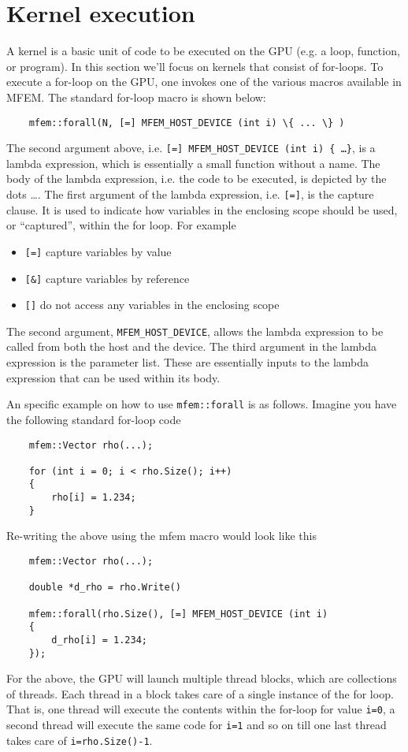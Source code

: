 \documentclass[a4paper,11pt]{article}
\begin{document}
\section{Kernel execution}
\label{sec:for_loops}
A kernel is a basic unit of code to be executed on the GPU (e.g. a loop, function, or program). In this section we'll focus on kernels that consist of for-loops. To execute a for-loop on the GPU, one invokes one of the various macros available in MFEM. The standard for-loop macro is shown below:
\begin{lstlisting}
    mfem::forall(N, [=] MFEM_HOST_DEVICE (int i) \{ ... \} )
\end{lstlisting}
The second argument above, i.e. \texttt{[=] MFEM\_HOST\_DEVICE (int i) \{ \dots \}}, is a lambda expression, which is essentially a small function without a name. The body of the lambda expression, i.e. the code to be executed, is depicted by the dots \dots. The first argument of the lambda expression, i.e. \texttt{[=]}, is the capture clause. It is used to indicate how variables in the enclosing scope should be used, or ``captured'', within the for loop. For example
\begin{itemize}
    \item \texttt{[=]} capture variables by value
    \item \texttt{[\&]} capture variables by reference
    \item \texttt{[]} do not access any variables in the enclosing scope
\end{itemize}
The second argument, \texttt{MFEM\_HOST\_DEVICE}, allows the lambda expression to be called from both the host and the device. The third argument in the lambda expression is the parameter list. These are essentially inputs to the lambda expression that can be used within its body. 

An specific example on how to use \texttt{mfem::forall} is as follows. Imagine you have the following standard for-loop code
\begin{lstlisting}
    mfem::Vector rho(...);

    for (int i = 0; i < rho.Size(); i++)
    {
        rho[i] = 1.234;
    }
\end{lstlisting}
Re-writing the above using the mfem macro would look like this
\begin{lstlisting}
    mfem::Vector rho(...);

    double *d_rho = rho.Write()

    mfem::forall(rho.Size(), [=] MFEM_HOST_DEVICE (int i)
    {
        d_rho[i] = 1.234;
    });
\end{lstlisting}
For the above, the GPU will launch multiple thread blocks, which are collections of threads. Each thread in a block takes care of a single instance of the for loop. That is, one thread will execute the contents within the for-loop for value \texttt{i=0}, a second thread will execute the same code for \texttt{i=1} and so on till one last thread takes care of \texttt{i=rho.Size()-1}.
\end{document}
